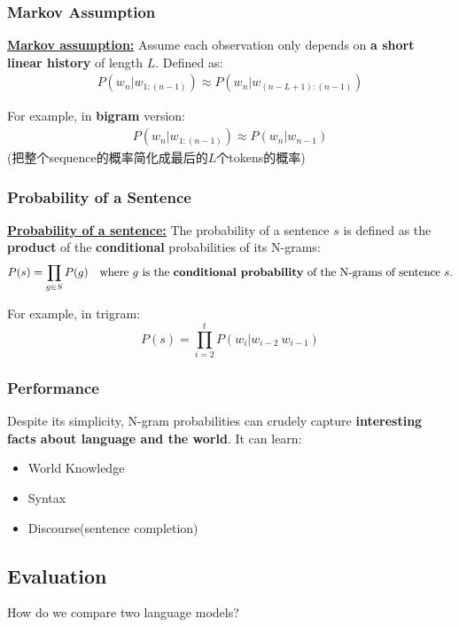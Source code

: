 \documentclass{ainote}
\begin{document}
\subsubsection{Markov Assumption}
\begin{info}
    \textbf{\underline{Markov assumption:}}
    \spskip
    Assume each observation only depends on \textbf{a short linear history} of length $L$. Defined as:
    \begin{align*}
        P(w_n|w_{1:(n-1)})\approx P(w_n|w_{(n-L+1):(n-1)})
    \end{align*}
\end{info}
For example, in \textbf{bigram} version:
\begin{align*}
    P(w_n|w_{1:(n-1)})\approx P(w_n|w_{n-1})
\end{align*}
(把整个sequence的概率简化成最后的$L$个tokens的概率)

\subsubsection{Probability of a Sentence}
\begin{info}
    \textbf{\underline{Probability of a sentence:}}
    \spskip
    The probability of a sentence $s$ is defined as the \textbf{product} of the \textbf{conditional} probabilities of its N-grams:
    \begin{align*}
        P(s)=\prod_{g\in S} P(g) \quad\text{where $g$ is the \textbf{conditional probability} of the N-grams of sentence $s$.}
    \end{align*}
\end{info}
For example, in trigram:
\begin{equation*}
    P(s)=\prod^t_{i=2} P(w_i|w_{i-2}\ w_{i-1})
\end{equation*}

\subsubsection{Performance}
Despite its simplicity, N-gram probabilities can crudely capture \textbf{interesting facts about language and the world}. It can learn:
\begin{itemize}
    \item World Knowledge
    \item Syntax
    \item Discourse(sentence completion)
\end{itemize}

\subsection{Evaluation}
How do we compare two language models?
\end{document}
